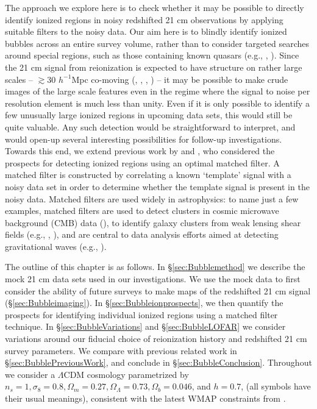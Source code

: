 The approach we explore here is to check whether it may be possible to directly identify ionized regions in
noisy redshifted 21 cm observations by applying suitable filters to the noisy data. Our aim here is to blindly identify ionized bubbles across an entire survey volume, rather than to consider targeted searches around special
regions, such as those containing known quasars (e.g., \citealt{Wyithe:2004ta}, \citealt{Friedrich:2012fy}).
Since the 21 cm signal from reionization is
expected to have structure on rather large scales -- $\gtrsim 30$ $h^{-1}$Mpc co-moving (\citealt{Furlanetto:2004nh}, \citealt{Iliev:2005sz}, \citealt{Zahn:2006sg}, \citealt{McQuinn:2006et}) -- it may be possible to make
crude images of the large scale features even in the regime where the signal to noise per resolution element is much less
than unity.  Even if it is only possible to identify a few unusually large ionized regions in upcoming data sets, this would
still be quite valuable. Any such detection would be straightforward to interpret, and would open-up several interesting
possibilities for follow-up investigations.
Towards this end, we extend previous work by \citet{Datta:2007nj} and \citet{Datta:2008ry}, who considered the prospects for detecting
ionized regions using an optimal matched filter. A matched filter is constructed by correlating a known `template' signal with a
noisy data set in order to determine whether the template signal is present in the noisy data. Matched filters are used
widely in astrophysics: to name just a few examples, matched filters are used to detect clusters in cosmic microwave background (CMB) data (\citealt{Haehnelt:1995dg}), to identify galaxy clusters from weak lensing shear fields (e.g., \citealt{Hennawi:2004ai}, \citealt{Marian:2008fd}), 
and are central to data analysis efforts aimed at detecting gravitational waves (e.g., \citealt{Owen:1998dk}).

The outline of this chapter is as follows. In \S\ref{sec:Bubblemethod} we describe the mock 21 cm data sets used in our investigations.
We use the mock data to first consider the ability of future surveys
to make maps of the redshifted 21 cm signal (\S\ref{sec:Bubbleimaging}). In \S\ref{sec:Bubbleionprospects}, 
we then quantify the prospects for identifying individual ionized regions using
a matched filter technique. In \S\ref{sec:BubbleVariations} and \S\ref{sec:BubbleLOFAR} we
consider variations around our fiducial choice of reionization history and redshifted
21 cm survey parameters. We compare with previous related work in \S\ref{sec:BubblePreviousWork},
and conclude in \S \ref{sec:BubbleConclusion}.
Throughout we consider a $\Lambda$CDM cosmology
parametrized by $n_s =1, \sigma_8 = 0.8, \Omega_m = 0.27,
\Omega_\Lambda = 0.73, \Omega_b = 0.046$, and $h=0.7$, (all symbols
have their usual meanings), consistent with the latest WMAP
constraints from \citet{Komatsu:2010fb}.


